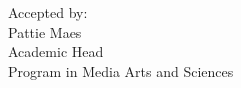 \begin{titlepage}
\begin{addmargin}[-1cm]{-2cm}
{        Accepted by:\\
        Pattie Maes \\
        Academic Head\\
        Program in Media Arts and Sciences\\         

        


        





        }
  \end{addmargin}       
\end{titlepage}   
